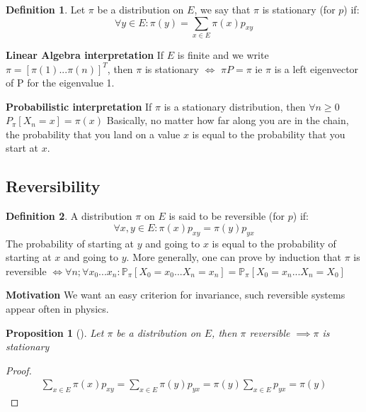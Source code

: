 \documentclass[12pt]{book}
\renewcommand{\iff}{\Leftrightarrow}
\newtheorem{prop}[theorem]{Proposition}
\theoremstyle{definition}
\newtheorem{defn}{Definition}[section]
\theoremstyle{remark}
\begin{document}
\begin{defn}
	Let $\pi$ be a distribution on $E$, we say that $\pi$ is stationary (for $p$) if:
\begin{equation}
	\forall y \in E: \pi(y) = \sum_{x \in E} \pi(x)p_{xy}
\end{equation}

\textbf{Linear Algebra interpretation} If $E$ is finite and we write  $\pi = [\pi(1)...\pi(n)]^T$, then $\pi$ is stationary $ \iff$ $\pi P = \pi$ ie $\pi$ is a left eigenvector of P for the eigenvalue 1.

\textbf{Probabilistic interpretation} If $\pi $ is a stationary distribution, then $\forall n \geq 0$ $P_{\pi }[X_n =x] = \pi (x)$
\newline \indent
Basically, no matter how far along you are in the chain, the probability that you land on a value $x$ is equal to the probability that you start at $x$.
\end{defn}

\subsection{Reversibility}
\begin{defn}
	A distribution $\pi $ on $ E$ is said to be reversible (for $p$) if:
\begin{equation}
	\forall x,y \in E: \pi (x) p_{xy}= \pi (y)p_{yx}
\end{equation}
The probability of starting at $y$ and going to $x$ is equal to the probability of starting at $x$ and going to $y$. More generally, one can prove by induction that $\pi $ is reversible $ \iff \forall n; \forall x_0...x_n: \mathbb{P}_{\pi } \left[ X_0=x_0...X_n=x_n \right] = \mathbb{P}_{\pi } \left[ X_0=x_n...X_n=X_0 \right] $
\end{defn}

\textbf{Motivation} We want an easy criterion for invariance, such reversible systems appear often in physics.

\begin{prop}[]
	Let $\pi $ be a distribution on $E$, then $\pi $ reversible $\implies \pi $ is stationary
\end{prop}
\begin{proof}
	\begin{gather}
		\sum_{x \in E}^{} \pi (x)p_{xy} = \sum_{x \in E}^{} \pi (y) p_{yx} = \pi (y) \sum_{x \in E}^{} p_{yx} = \pi(y) 
	\end{gather}
	
\end{proof}
\end{document}
